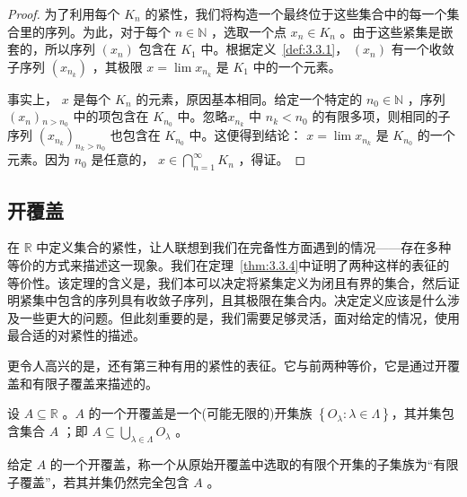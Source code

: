 \begin{proof}
  为了利用每个 \({K}_{n}\) 的紧性，我们将构造一个最终位于这些集合中的每一个集合里的序列。为此，对于每个 \(n \in  \mathbb{N}\) ，选取一个点 \({x}_{n} \in  {K}_{n}\) 。由于这些紧集是嵌套的，所以序列 \(\left( {x}_{n}\right)\) 包含在 \({K}_{1}\) 中。根据定义~\ref{def:3.3.1}， \(\left( {x}_{n}\right)\) 有一个收敛子序列 \(\left( {x}_{{n}_{k}}\right)\) ，其极限 \(x = \lim {x}_{{n}_{k}}\) 是 \({K}_{1}\) 中的一个元素。

事实上， \(x\) 是每个 \({K}_{n}\) 的元素，原因基本相同。给定一个特定的 \({n}_{0} \in  \mathbb{N}\) ，序列 \(\left( {x}_{n}\right)\)$_{n>n_0}$ 中的项包含在 \({K}_{{n}_{0}}\) 中。忽略$x_{n_k}$ 中 $n_k<n_0$ 的有限多项，则相同的子序列 \(\left( {x}_{{n}_{k}}\right)_{n_k>n_0}\) 也包含在 \({K}_{{n}_{0}}\) 中。这便得到结论： \(x = \lim {x}_{{n}_{k}}\) 是 \({K}_{{n}_{0}}\) 的一个元素。因为 \({n}_{0}\) 是任意的， \(x \in  \mathop{\bigcap }\limits_{{n = 1}}^{\infty }{K}_{n}\) ，得证。
\end{proof}


\subsection{开覆盖}
在 \(\mathbb{R}\) 中定义集合的紧性，让人联想到我们在完备性方面遇到的情况——存在多种等价的方式来描述这一现象。我们在定理~\ref{thm:3.3.4}中证明了两种这样的表征的等价性。该定理的含义是，我们本可以决定将紧集定义为闭且有界的集合，然后证明紧集中包含的序列具有收敛子序列，且其极限在集合内。决定定义应该是什么涉及一些更大的问题。但此刻重要的是，我们需要足够灵活，面对给定的情况，使用最合适的对紧性的描述。

更令人高兴的是，还有第三种有用的紧性的表征。它与前两种等价，它是通过开覆盖和有限子覆盖来描述的。

\begin{Def}
  \label{def:3.3.6}
  设 \(A \subseteq  \mathbb{R}\) 。\(A\) 的一个开覆盖是一个(可能无限的)开集族 \(\left\{  {{O}_{\lambda } : \lambda  \in  \Lambda }\right\}\)，其并集包含集合 \(A\) ；即 \(A \subseteq  \mathop{\bigcup }\limits_{{\lambda  \in  \Lambda }}{O}_{\lambda }\) 。

  给定 \(A\) 的一个开覆盖，称一个从原始开覆盖中选取的有限个开集的子集族为“有限子覆盖”，若其并集仍然完全包含 \(A\) 。
\end{Def}

